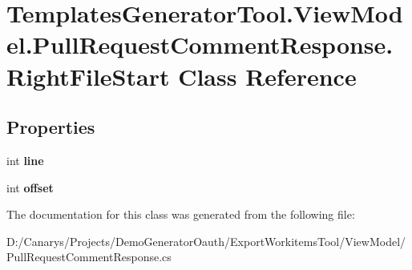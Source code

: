 \hypertarget{class_templates_generator_tool_1_1_view_model_1_1_pull_request_comment_response_1_1_right_file_start}{}\section{Templates\+Generator\+Tool.\+View\+Model.\+Pull\+Request\+Comment\+Response.\+Right\+File\+Start Class Reference}
\label{class_templates_generator_tool_1_1_view_model_1_1_pull_request_comment_response_1_1_right_file_start}
\subsection*{Properties}
\begin{DoxyCompactItemize}
\item 
\mbox{\label{class_templates_generator_tool_1_1_view_model_1_1_pull_request_comment_response_1_1_right_file_start_a829ef113ac6c5f649cb377954b1e2ba8}} 
int {\bfseries line}
\item 
\mbox{\label{class_templates_generator_tool_1_1_view_model_1_1_pull_request_comment_response_1_1_right_file_start_a298a1f012daf233c09e9301da25cb20d}} 
int {\bfseries offset}
\end{DoxyCompactItemize}


The documentation for this class was generated from the following file\+:\begin{DoxyCompactItemize}
\item 
D\+:/\+Canarys/\+Projects/\+Demo\+Generator\+Oauth/\+Export\+Workitems\+Tool/\+View\+Model/Pull\+Request\+Comment\+Response.\+cs\end{DoxyCompactItemize}

